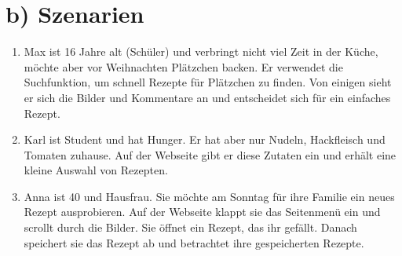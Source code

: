 \documentclass[parskip,10pt,abstracton]{scrartcl}
\begin{document}
\pagebreak
\section*{b) Szenarien}

\begin{enumerate}[(1)]
 \item Max ist 16 Jahre alt (Schüler) und verbringt nicht viel Zeit in der Küche, möchte aber vor Weihnachten Plätzchen backen. Er verwendet die Suchfunktion, um schnell Rezepte für Plätzchen zu finden. Von einigen sieht er sich die Bilder und Kommentare an und entscheidet sich für ein einfaches Rezept.
 
 
 \item Karl ist Student und hat Hunger. Er hat aber nur Nudeln, Hackfleisch und Tomaten zuhause. Auf der Webseite gibt er diese Zutaten ein und erhält eine kleine Auswahl von Rezepten. 
 
 
 \item Anna ist 40 und Hausfrau. Sie möchte am Sonntag für ihre Familie ein neues Rezept ausprobieren. Auf der Webseite klappt sie das Seitenmenü ein und scrollt durch die Bilder. Sie öffnet ein Rezept, das ihr gefällt. Danach speichert sie das Rezept ab und betrachtet ihre gespeicherten Rezepte. 
 
\end{enumerate}
\end{document}
